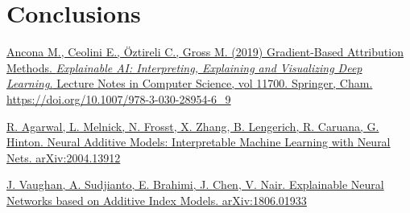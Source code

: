 \documentclass[conference]{report}
\begin{document}
\chapter{Conclusions}
 
\begin{thebibliography}{1}
\href{run:https://link.springer.com/chapter/10.1007/978-3-030-28954-6_9}{Ancona M., Ceolini E., Öztireli C., Gross M. (2019) Gradient-Based Attribution Methods. \emph{Explainable AI: Interpreting, Explaining and Visualizing Deep Learning.} Lecture Notes in Computer Science, vol 11700. Springer, Cham. https://doi.org/10.1007/978-3-030-28954-6\_9}

\href{run:https://link.springer.com/chapter/10.1007/978-3-030-28954-6_9}{R. Agarwal, L. Melnick, N. Frosst, X. Zhang, B. Lengerich, R. Caruana, G. Hinton. Neural Additive Models:
Interpretable Machine Learning with Neural Nets. arXiv:2004.13912}

\href{run:https://link.springer.com/chapter/10.1007/978-3-030-28954-6_9}{J. Vaughan, A. Sudjianto, E. Brahimi, J. Chen, V. Nair. Explainable Neural Networks based on Additive Index Models. arXiv:1806.01933}




\end{thebibliography}
\end{document}
